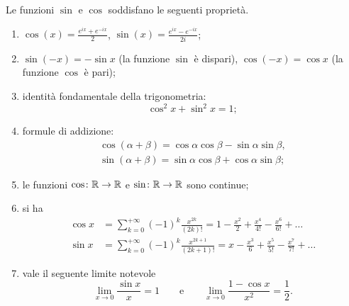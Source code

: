 \begin{theorem}
%
\mymark{***}%
Le funzioni $\sin$ e $\cos$
soddisfano le seguenti proprietà.
\begin{enumerate}
\item
$\displaystyle
\cos(x) = \frac{e^{ix}+e^{-ix}}{2}$,
$\displaystyle
\sin(x) = \frac{e^{ix}-e^{-ix}}{2i}$;
\item
$\sin(-x) = -\sin x$ (la funzione $\sin$ è dispari),
$\cos(-x) = \cos x$ (la funzione $\cos$ è pari);
\item identità fondamentale della trigonometria:
%
%
%
\[
\cos^2 x + \sin^2 x = 1;
\]
\item
formule di addizione:
%
%
%
\begin{gather*}
\cos(\alpha+\beta) = \cos \alpha \cos \beta - \sin \alpha \sin \beta,\\
\sin(\alpha+\beta) = \sin \alpha \cos \beta + \cos \alpha \sin \beta;
\end{gather*}
\item
le funzioni $\cos\colon {\mathbb R}\to{\mathbb R}$ e $\sin \colon {\mathbb R} \to {\mathbb R}$
sono continue;
\item si ha
%
%
%
%
\begin{align}
\label{eq:serie_cos}
\cos x &= \sum_{k=0}^{+\infty} (-1)^k\frac{x^{2k}}{(2k)!}
  = 1 - \frac{x^2}{2} + \frac{x^4}{4!} - \frac{x^6}{6!} + \dots
\\
\label{eq:serie_sin}
\sin x &= \sum_{k=0}^{+\infty} (-1)^k\frac{x^{2k+1}}{(2k+1)!}
  = x - \frac{x^3}{6} + \frac{x^5}{5!} - \frac{x^7}{7!} + \dots
\end{align}
\item
vale il seguente limite notevole
\[
 \lim_{x\to 0} \frac{\sin x}{x} = 1
 \qquad\text{e}\qquad
 \lim_{x\to 0} \frac{1-\cos x}{x^2} = \frac 1 2.
\]
\end{enumerate}
\end{theorem}
%
\newsavebox{\qrfigtrigo}%
